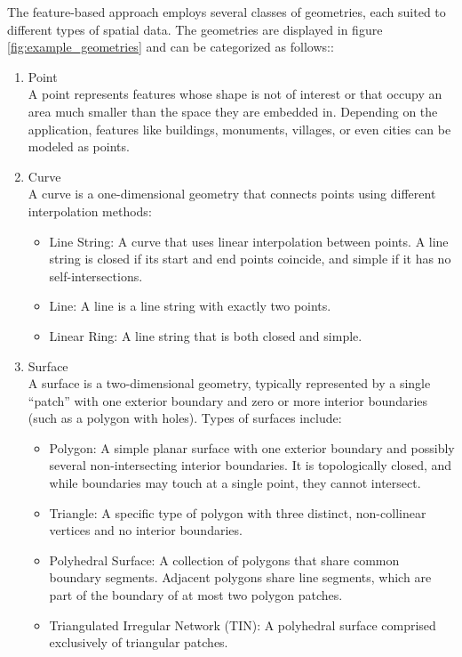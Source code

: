 The feature-based approach employs several classes of geometries, each suited to different types of spatial data. The geometries are displayed in figure \ref{fig:example_geometries} and can be categorized as follows::
\begin{enumerate}
    \item Point \\
    A point represents features whose shape is not of interest or that occupy an area much smaller than the space they are embedded in. Depending on the application, features like buildings, monuments, villages, or even cities can be modeled as points.

    \item Curve \\
    A curve is a one-dimensional geometry that connects points using different interpolation methods:

    \begin{itemize}
        \item Line String: A curve that uses linear interpolation between points. A line string is closed if its start and end points coincide, and simple if it has no self-intersections.
        \item Line: A line is a line string with exactly two points.
        \item Linear Ring: A line string that is both closed and simple.
    \end{itemize}

    \item Surface \\
    A surface is a two-dimensional geometry, typically represented by a single ``patch'' with one exterior boundary and zero or more interior boundaries (such as a polygon with holes). Types of surfaces include:
    
    \begin{itemize}
        \item Polygon: A simple planar surface with one exterior boundary and possibly several non-intersecting interior boundaries. It is topologically closed, and while boundaries may touch at a single point, they cannot intersect.
        \item Triangle: A specific type of polygon with three distinct, non-collinear vertices and no interior boundaries.
        \item Polyhedral Surface: A collection of polygons that share common boundary segments. Adjacent polygons share line segments, which are part of the boundary of at most two polygon patches.
        \item Triangulated Irregular Network (TIN): A polyhedral surface comprised exclusively of triangular patches.
    \end{itemize}
    

\end{enumerate}
